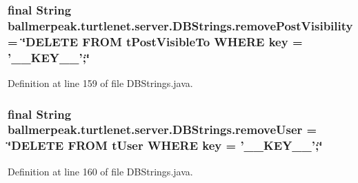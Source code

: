 \hypertarget{classballmerpeak_1_1turtlenet_1_1server_1_1DBStrings_a2541bcdbb1f43144be6a70b42199b0d2}{
\subsubsection[{remove\-Post\-Visibility}]{\setlength{\rightskip}{0pt plus 5cm}final String ballmerpeak.\-turtlenet.\-server.\-D\-B\-Strings.\-remove\-Post\-Visibility = \char`\"{}D\-E\-L\-E\-T\-E F\-R\-O\-M t\-Post\-Visible\-To W\-H\-E\-R\-E key = '\-\_\-\-\_\-\-K\-E\-Y\-\_\-\-\_\-';\char`\"{}\hspace{0.3cm}{\ttfamily [static]}}}\label{classballmerpeak_1_1turtlenet_1_1server_1_1DBStrings_a2541bcdbb1f43144be6a70b42199b0d2}


Definition at line 159 of file D\-B\-Strings.\-java.

\hypertarget{classballmerpeak_1_1turtlenet_1_1server_1_1DBStrings_a7280cd9a150a098b62c0d23a88eeb566}{
\subsubsection[{remove\-User}]{\setlength{\rightskip}{0pt plus 5cm}final String ballmerpeak.\-turtlenet.\-server.\-D\-B\-Strings.\-remove\-User = \char`\"{}D\-E\-L\-E\-T\-E F\-R\-O\-M t\-User W\-H\-E\-R\-E key = '\-\_\-\-\_\-\-K\-E\-Y\-\_\-\-\_\-';\char`\"{}\hspace{0.3cm}{\ttfamily [static]}}}\label{classballmerpeak_1_1turtlenet_1_1server_1_1DBStrings_a7280cd9a150a098b62c0d23a88eeb566}


Definition at line 160 of file D\-B\-Strings.\-java.

